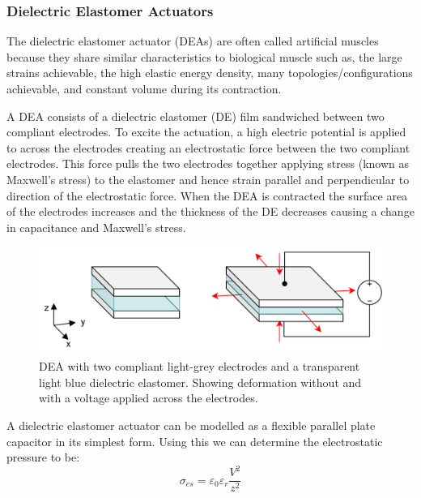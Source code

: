 \subsubsection{Dielectric Elastomer Actuators}
The dielectric elastomer actuator (DEAs) are often called artificial muscles because they share similar characteristics to biological muscle such as, the large strains achievable, the high elastic energy density, many topologies/configurations achievable, and constant volume during its contraction.

A DEA consists of a dielectric elastomer (DE) film sandwiched between two compliant electrodes. To excite the actuation, a high electric potential is applied to across the electrodes creating an electrostatic force between the two compliant electrodes. This force pulls the two electrodes together applying stress (known as Maxwell's stress) to the elastomer and hence strain parallel and perpendicular to direction of the electrostatic force. When the DEA is contracted the surface area of the electrodes increases and the thickness of the DE decreases causing a change in capacitance and Maxwell's stress.
\begin{figure}[h!]
	\centering
	\includegraphics[width=0.7\linewidth]{Figures/dea_square_2state.jpg}
	\caption{DEA with two compliant light-grey electrodes and a transparent light blue dielectric elastomer. Showing deformation without and with a voltage applied across the electrodes.}
	\label{fig:Artificial Muscle_DEA}
\end{figure}
A dielectric elastomer actuator can be modelled as a flexible parallel plate capacitor in its simplest form. Using this we can determine the electrostatic pressure to be:
\begin{equation}
	\sigma_{es} = \varepsilon_0 \varepsilon_r \frac{V^2}{z^2}
\end{equation}
